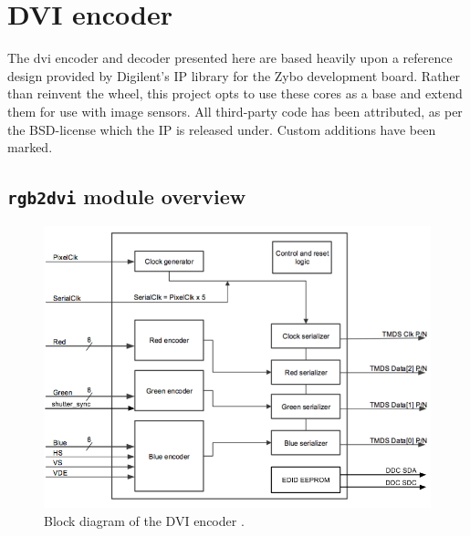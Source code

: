 \section{DVI encoder}


The \gls{dvi} encoder and decoder presented here are based heavily upon a reference design provided by Digilent's IP library for the Zybo development board. Rather than reinvent the wheel, this project opts to use these cores as a base and extend them for use with image sensors. All third-party code has been attributed, as per the BSD-license which the IP is released under. Custom additions have been marked.

\subsection{\texttt{rgb2dvi} module overview}
\begin{figure}
  \centering
  \includegraphics[width=1\textwidth]{./img/rgb2dvi.png}
  \caption{Block diagram of the DVI encoder \cite{rgb2dvi}.}
  \label{fig:rgb2dvi}
\end{figure}

